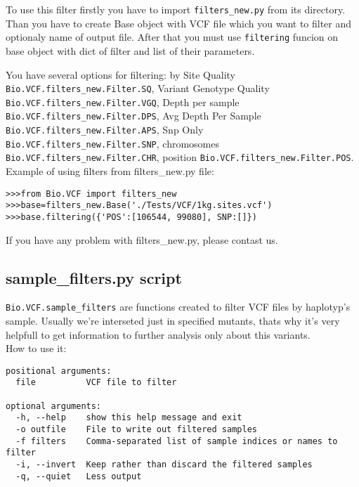 \noindent To use this filter firstly you have to import \verb|filters_new.py| from its directory. 
\noindent Than you have to create Base object with VCF file which you want to filter and optionaly name of output file. After that you must use \verb|filtering| funcion on base object with dict of filter and list of their parameters.

\noindent You have several options for filtering: by  Site Quality \verb|Bio.VCF.filters_new.Filter.SQ|, Variant Genotype Quality \verb|Bio.VCF.filters_new.Filter.VGQ|, Depth per sample \verb|Bio.VCF.filters_new.Filter.DPS|, Avg Depth Per Sample \verb|Bio.VCF.filters_new.Filter.APS|, Snp Only \verb|Bio.VCF.filters_new.Filter.SNP|, chromosomes \verb|Bio.VCF.filters_new.Filter.CHR|, position \verb|Bio.VCF.filters_new.Filter.POS|.\\


\noindent Example of using filters from filters\_new.py file:
\begin{verbatim}
>>>from Bio.VCF import filters_new
>>>base=filters_new.Base('./Tests/VCF/1kg.sites.vcf')
>>>base.filtering({'POS':[106544, 99080], SNP:[]})
\end{verbatim}

\noindent If you have any problem with filters\_new.py, please contast us. 

\subsection{sample\_filters.py script}
\noindent \verb|Bio.VCF.sample_filters| are functions created to filter VCF files by haplotyp's sample.
Usually we're interseted just in specified mutants, thats why it's very helpfull to get information to further analysis only about this variants.\\

\noindent How to use it:

\begin{verbatim}
positional arguments:
  file          VCF file to filter

optional arguments:
  -h, --help    show this help message and exit
  -o outfile    File to write out filtered samples
  -f filters    Comma-separated list of sample indices or names to filter
  -i, --invert  Keep rather than discard the filtered samples
  -q, --quiet   Less output
\end{verbatim}

